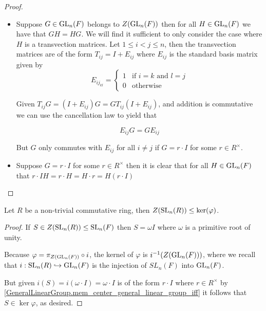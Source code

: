     \begin{proof}
        \leanok
        \begin{itemize}
        \item Suppose $G \in \operatorname{GL}_n(F)$ belongs to $Z(\operatorname{GL}_n(F))$ then for all $H \in \operatorname{GL}_n(F)$ we have that $G H = H G$. We will find it sufficient to only consider the case where $H$ is a transvection matrices.
        Let $1 \leq i < j \leq n$, then the transvection matrices are of the form $T_{ij} = I + E_{ij}$ where $E_{ij}$ is the standard basis matrix given by
        \[
        E_{{ij}_{kl}} = \begin{cases}
        1 & \text{if $i = k$ and $l = j$}\\
        0 & \text{otherwise}
        \end{cases}
        \] 
    
        Given $T_{ij} G = (I + E_{ij}) G = G T_{ij} (I + E_{ij})$, and addition is commutative we can use the cancellation law to yield that
        
        \[
        E_{ij} G = G E_{ij}
        \]
    
        But $G$ only commutes with $E_{ij}$ for all $i \neq j$ if $G = r \cdot I$ for some $r \in R^\times$.
        
        \item Suppose $G = r \cdot I$ for some $r \in R^\times$ then it is clear that for all $H \in \operatorname{GL}_n(F)$ that $r \cdot I  H = r \cdot H = H \cdot r = H (r \cdot I)$
        \end{itemize}
    \end{proof}


\begin{lemma}
\label{center_SL_le_ker}
\leanok
Let $R$ be a non-trivial commutative ring, then $Z(\operatorname{SL}_n(R)) \le \ker (\varphi)$.
\end{lemma}
\begin{proof}
\leanok
If $S \in Z(\operatorname{SL}_n(R)) \leq \operatorname{SL}_n(F)$ then $S = \omega I$ where $\omega$ is a primitive root of unity.

Because $\varphi = \pi_{Z(\operatorname{GL}_n(F))} \circ i$, the kernel of $\varphi$ is $i^{-1}(Z(\operatorname{GL}_n(F)))$, where we recall that $i : \operatorname{SL}_n(R) \hookrightarrow \operatorname{GL}_n(F)$ is the injection of $SL_n(F)$ into $\operatorname{GL}_n(F)$.

But given $i(S) = i(\omega \cdot I) = \omega \cdot I$ is of the form $r \cdot I$ where $r \in R^\times$ by \ref{GeneralLinearGroup.mem_center_general_linear_group_iff} it follows that $S \in \ker \varphi$, as desired.
\end{proof}




